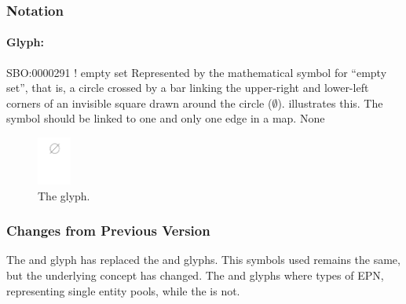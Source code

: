 
\subsubsection{Notation}

\paragraph{Glyph: }

\begin{glyphDescription}
\glyphSboTerm SBO:0000291 ! empty set
\glyphContainer Represented by the mathematical symbol for ``empty
set'', that is, a circle crossed by a bar linking the upper-right and
lower-left corners of an invisible square drawn around the circle ($\emptyset$).
 illustrates this.  The symbol should be linked to one
and only one edge in a map.
\glyphLabel None
\end{glyphDescription}

\begin{figure}[htb]
  \centering
  \includegraphics[width = 0.1\textwidth]{images/sourceSink}
  \caption{The  glyph.}
  \label{fig:techref:sourceSink}
\end{figure}

\subsubsection{Changes from Previous Version}

The  and  glyph has replaced the
 and  glyphs. This symbols used remains the
same, but the underlying concept has changed. The  and
 glyphs where types of EPN, representing single entity
pools, while the  is not.

